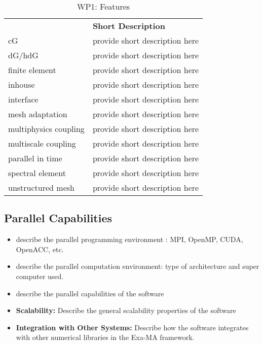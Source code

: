 \begin{table}[h!]
    \centering
    {
        \setlength{\parindent}{0pt}
        \def\arraystretch{1.25}
        {
            \fontsize{9}{11}\selectfont
            \begin{tabular}{!{\color{numpexgray}\vrule}p{.25\linewidth}!{\color{numpexgray}\vrule}p{.6885\linewidth}!{\color{numpexgray}\vrule}}

     &  {\rule{0pt}{2.5ex}\color{white}\bf Short Description }\\

    cG & provide short description here \\
    dG/hdG & provide short description here \\
    finite element & provide short description here \\
    inhouse & provide short description here \\
    interface & provide short description here \\
    mesh adaptation & provide short description here \\
    multiphysics coupling & provide short description here \\
    multiscale coupling & provide short description here \\
    parallel in time & provide short description here \\
    spectral element & provide short description here \\
    unstructured mesh & provide short description here \\
\end{tabular}
        }
    }
    \caption{WP1: \Feelpp Features}
    \label{tab:WP1:Feelpp:features}
\end{table}


\subsection{Parallel Capabilities}
\label{sec:WP1:Feelpp:performances}


\begin{itemize}
    \item describe the parallel programming  environment : MPI, OpenMP, CUDA, OpenACC, etc.
    \item describe the parallel computation environment: type of architecture and super computer used.
    \item describe the parallel capabilities of the software
    \item \textbf{Scalability:} Describe the general scalability properties of the software
    \item \textbf{Integration with Other Systems:} Describe how the software integrates with other numerical libraries in the Exa-MA framework.
\end{itemize}


